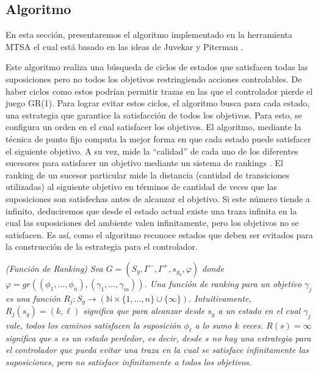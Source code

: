 \subsection{Algoritmo}

En esta sección, presentaremos el algoritmo implementado en la herramienta MTSA \cite{4639371} el cual está basado en las
ideas de Juvekar y Piterman \cite{Juvekar:buchi}.

Este algoritmo realiza una búsqueda de ciclos de estados que satisfacen todas las suposiciones pero no todos los objetivos
restringiendo acciones controlables. De haber ciclos como estos podrían permitir trazas en las que el controlador
pierde el juego GR(1). Para lograr evitar estos ciclos, el algoritmo busca para cada estado, una estrategia que
garantice la satisfacción de todos los objetivos. Para esto, se configura un orden en el cual satisfacer los objetivos.
El algoritmo, mediante la técnica de punto fijo computa la mejor forma en que cada estado puede satisfacer el siguiente
objetivo. A su vez, mide la ``calidad'' de cada uno de los diferentes sucesores para satisfacer un objetivo mediante un
sistema de rankings \cite{Jurdzinski:ParityGames}. El ranking de un sucesor particular mide la distancia (cantidad de transiciones utilizadas)
al siguiente objetivo en términos de cantidad de veces que las suposiciones son satisfechas antes de alcanzar el objetivo.
Si este número tiende a infinito, deduciremos que desde el estado actual existe una traza infinita en la cual las
suposiciones del ambiente valen infinitamente, pero los objetivos no se satisfacen. Es así, como el algoritmo reconoce
estados que deben ser evitados para la construcción de la estrategia para el controlador.

\begin{nahaDef}
    \emph{(Función de Ranking) Sea $G = (S_g,\Gamma^-,\Gamma^+,s_{g_0},\varphi)$ donde \\$\varphi = 
    gr(( \phi_1 ,..., \phi_n ),( \gamma_1 ,..., \gamma_m ) )$. Una función de ranking para un objetivo $\gamma_j$ es una función
    $R_j : S_g \rightarrow (\mathbb{N} \times \{1,...,n\}\cup\{\infty\})$. Intuitivamente, $R_j(s_g) = (k,\ell)$
    significa que para alcanzar desde $s_g$ a un estado en el cual $\gamma_j$ vale, todos los caminos satisfacen
    la suposición $\phi_{\ell}$ a lo sumo $k$ veces. $R(s) = \infty$ significa que $s$ es un estado perdedor, es decir,
    desde $s$ no hay una estrategia para el controlador que pueda evitar una traza en la cual se satisface infinitamente
    las suposiciones, pero no satisface infinitamente a todos los objetivos.}
\end{nahaDef}

